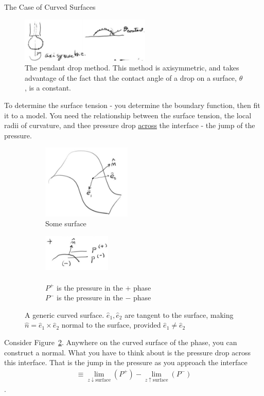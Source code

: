 \documentclass{article}
\begin{document}
\begin{section}{The Case of Curved Surfaces}
	\begin{figure}[h]
		\centering
		\includegraphics[height=60pt]{pendantDrop}
		\caption{The pendant drop method. This method is axisymmetric, and takes advantage of the fact that the contact angle of a drop on a surface, $\theta$, is a constant.}
		\label{fig:pendant drop}
	\end{figure}

	To determine the surface tension - you determine the boundary function, then fit it to a model. You need the relationship between the surface tension, the local radii of curvature, and thee pressure drop \underline{across} the interface - the jump of the pressure.
	\begin{figure}[h]
		\centering
		\begin{subfigure}[t]{0.4\textwidth}
			\includegraphics[height=100pt]{generalSurface}
			\caption{Some surface}
		\end{subfigure}
		\begin{subfigure}[t]{0.4\textwidth}
			\includegraphics[height=50pt]{curvedSurface}
			\caption{\\$P^+$ is the pressure in the $+$ phase\\	
			$P^-$ is the pressure in the $-$ phase}
		\end{subfigure}
		\caption{A generic curved surface. $\hat{e}_1,\hat{e}_2$ are tangent to the surface, making $\hat{n} = \hat{e}_1\times\hat{e}_2$ normal to the surface, provided $\hat{e}_1\neq\hat{e}_2$}
		\label{fig:surface}
	\end{figure}
	Consider Figure~\ref{fig:surface}. Anywhere on the curved surface of the phase, you can construct a normal. What you have to think about is the pressure drop across this interface. That is the jump in the pressure as you approach the interface 
	\begin{align*}
		[P] \equiv \lim_{z\downarrow \mathrm{surface}}{( P^{+})} - \lim_{z\uparrow \mathrm{surface}}{( P^{-})}
	\end{align*}.
\end{section}
\end{document}
